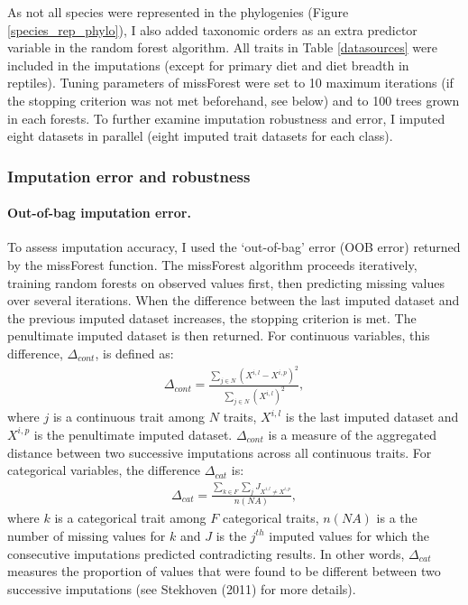 As not all species were represented in the phylogenies (Figure \ref{species_rep_phylo}), I also added taxonomic orders as an extra predictor variable in the random forest algorithm. All traits in Table \ref{datasources} were included in the imputations (except for primary diet and diet breadth in reptiles). Tuning parameters of missForest were set to 10 maximum iterations (if the stopping criterion was not met beforehand, see below) and to 100 trees grown in each forests. To further examine imputation robustness and error, I imputed eight datasets in parallel (eight imputed trait datasets for each class).

\subsubsection{Imputation error and robustness}

\paragraph{Out-of-bag imputation error.}
To assess imputation accuracy, I used the `out-of-bag' error (OOB error) returned by the missForest function. The missForest algorithm proceeds iteratively, training random forests on observed values first, then predicting missing values over several iterations. When the difference between the last imputed dataset and the previous imputed dataset increases, the stopping criterion is met. The penultimate imputed dataset is then returned. For continuous variables, this difference, $\Delta_{cont}$,  is defined as:
\begin{align}
\Delta_{cont}=\frac{\sum_{j \in N}\left(X^{i,l}-X^{i,p}\right)^2}{\sum_{j \in N}\left(X^{i,l}\right)^2}, 
\end{align}
where $j$ is a continuous trait among $N$ traits, $X^{i,l}$ is the last imputed dataset and $X^{i,p}$ is the penultimate imputed dataset.  $\Delta_{cont}$ is a measure of the aggregated distance between two successive imputations across all continuous traits.  For categorical variables, the difference $\Delta_{cat}$ is:
\begin{align}
\Delta_{cat}=\frac{\sum_{k \in F}\sum_{j} J_{X^{i,l}\neq X^{i,p}}}{n(NA)}, 
\label{eqPFC}
\end{align}
where $k$ is a categorical trait among $F$ categorical traits, $n(NA)$ is a the number of missing values for $k$ and $J$ is the $j^{th}$ imputed values for which the consecutive imputations predicted contradicting results. In other words, $\Delta_{cat}$ measures the proportion of values that were found to be different between two successive imputations
(see Stekhoven (2011) for more details).

